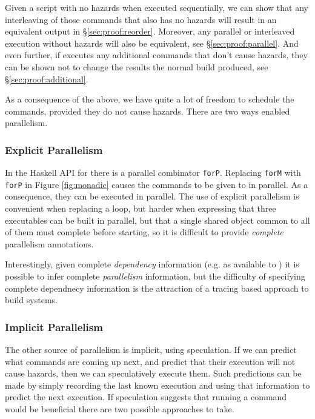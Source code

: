 Given a script with no hazards when executed sequentially, we can show that any interleaving of those commands that also has no hazards will result in an equivalent output in \S\ref{sec:proof:reorder}. Moreover, any parallel or interleaved execution without hazards will also be equivalent, see \S\ref{sec:proof:parallel}. And even further, if \Rattle executes any additional commands that don't cause hazards, they can be shown not to change the results the normal build produced, see \S\ref{sec:proof:additional}.

As a consequence of the above, we have quite a lot of freedom to schedule the commands, provided they do not cause hazards.  There are two ways \Rattle enabled parallelism.

\subsubsection{Explicit Parallelism}

In the Haskell API for \Rattle there is a parallel combinator \texttt{forP}. Replacing \texttt{forM} with \texttt{forP} in Figure \ref{fig:monadic} causes the commands to be given to \Rattle in parallel. As a consequence, they can be executed in parallel. The use of explicit parallelism is convenient when replacing a loop, but harder when expressing that three executables can be built in parallel, but that a single shared object common to all of them must complete before starting, so it is difficult to provide \emph{complete} parallelism annotations.

Interestingly, given complete \emph{dependency} information (e.g. as available to \Make) it is possible to infer complete \emph{parallelism} information, but the difficulty of specifying complete dependnecy information is the attraction of a tracing based approach to build systems.

\subsubsection{Implicit Parallelism}
\label{sec:speculation}

The other source of parallelism is implicit, using speculation. If we can predict what commands are coming up next, and predict that their execution will not cause hazards, then we can speculatively execute them.  Such predictions can be made by simply recording the last known execution and using that information to predict the next execution.  If speculation suggests that running a command would be beneficial there are two possible approaches to take.

